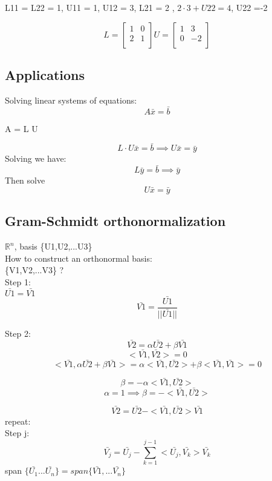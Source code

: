 \documentclass{article}
\begin{document}
L11 = L22 = 1, U11 = 1, U12 = 3, L21 = 2 , $ 2\cdot 3 +U22 =4 $, U22 =-2

$$ L= \begin{bmatrix}
1 & 0\\
2& 1\\
\end{bmatrix}
U= \begin{bmatrix}
1 & 3\\
0 & -2\\
\end{bmatrix}
$$


\subsection*{Applications}
Solving linear systems of equations:\\
$$ A\bar{x} = \bar{b} $$ 

A = L U 

$$ L \cdot U\bar{x} = \bar{b} \implies U \bar{x} = \bar{y} $$ 
Solving we have:
$$ L \bar{y}  = \bar{b} \implies \bar{y}$$ Then solve  $$U\bar{x} = \bar{y}$$

\subsection*{Gram-Schmidt orthonormalization}
$ \mathbb{R}^n $, basis \{U1,U2,...U3\}\\
How to construct an orthonormal basis:\\
\{V1,V2,...V3\} ? \\

Step 1: \\

$\bar{U1} = \bar{V1} $\\
$$\bar{V1} = \frac{\bar{U1}}{||\bar{U1}||} $$

Step 2: \\

$$\bar{V2}=\alpha \bar{U2} + \beta \bar{V1}$$
$$<\bar{V1}, \bar{V2}> = 0$$
$$ <\bar{V1}, \alpha \bar{U2}+\beta \bar{V1}> = \alpha <\bar{V1}, \bar{U2}> + \beta<\bar{V1}, \bar{V1}>  = 0$$

$$ \beta = -\alpha <\bar{V1}, \bar{U2}>$$
$$ \alpha = 1 \implies \beta = - <\bar{V1}, \bar{U2}>$$

$$ \bar{V2} = \bar{U2} - <\bar{V1}, \bar{U2}> \bar{V1} $$ repeat:\\
Step j:\\

$$ \bar{V_j} = \bar{U_j} - \sum_{k=1}^{j-1} <\bar{U_j}, \bar{V_k}>\bar{V_k}$$
span $\{\bar{U_1}...\bar{U_n}\} = span \{\bar{V1},...\bar{V_n}\}$
\end{document}
